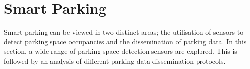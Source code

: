 \section{Smart Parking}
Smart parking can be viewed in two distinct areas; the utilisation of sensors to detect parking space occupancies and the dissemination of parking data. In this section, a wide range of parking space detection sensors are explored. This is followed by an analysis of different parking data dissemination protocols.